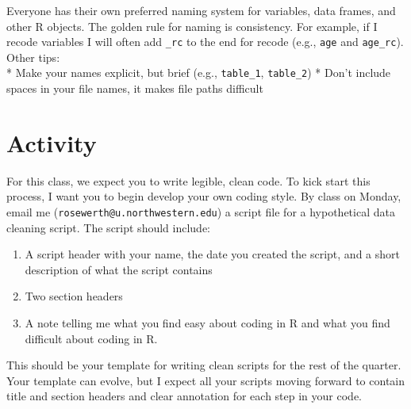 \documentclass[
]{book}
\providecommand{\tightlist}{%
  \setlength{\itemsep}{0pt}\setlength{\parskip}{0pt}}
\begin{document}
Everyone has their own preferred naming system for variables, data frames, and other R objects. The golden rule for naming is consistency. For example, if I recode variables I will often add \texttt{\_rc} to the end for recode (e.g., \texttt{age} and \texttt{age\_rc}). Other tips:\\
* Make your names explicit, but brief (e.g., \texttt{table\_1}, \texttt{table\_2})
* Don't include spaces in your file names, it makes file paths difficult

\hypertarget{activity-1}{%
\section{Activity}\label{activity-1}}

For this class, we expect you to write legible, clean code. To kick start this process, I want you to begin develop your own coding style. By class on Monday, email me (\texttt{rosewerth@u.northwestern.edu}) a script file for a hypothetical data cleaning script. The script should include:

\begin{enumerate}
\def\labelenumi{\arabic{enumi})}
\tightlist
\item
  A script header with your name, the date you created the script, and a short description of what the script contains
\item
  Two section headers
\item
  A note telling me what you find easy about coding in R and what you find difficult about coding in R.
\end{enumerate}

This should be your template for writing clean scripts for the rest of the quarter. Your template can evolve, but I expect all your scripts moving forward to contain title and section headers and clear annotation for each step in your code.

  
\end{document}
